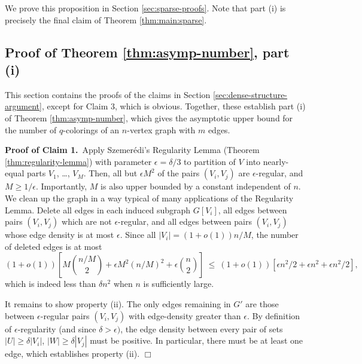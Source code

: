 \documentclass[11pt]{article}
\begin{document}
We prove this proposition in Section \ref{sec:sparse-proofs}.  Note
that part (i) is precisely the final claim of Theorem
\ref{thm:main:sparse}.




\subsection{Proof of Theorem \ref{thm:asymp-number}, part (i)}

This section contains the proofs of the claims in Section
\ref{sec:dense-structure-argument}, except for Claim 3, which is
obvious.  Together, these establish part (i) of Theorem
\ref{thm:asymp-number}, which gives the asymptotic upper bound for the
number of $q$-colorings of an $n$-vertex graph with $m$ edges.

\vspace{3mm}

\noindent \textbf{Proof of Claim 1.}\, Apply Szemer\'edi's Regularity
Lemma (Theorem \ref{thm:regularity-lemma}) with parameter $\epsilon =
\delta/3$ to partition of $V$ into nearly-equal parts $V_1$, \ldots,
$V_M$.  Then, all but $\epsilon M^2$ of the pairs $(V_i, V_j)$ are
$\epsilon$-regular, and $M \geq 1/\epsilon$.  Importantly, $M$ is also
upper bounded by a constant independent of $n$.  We clean up the graph
in a way typical of many applications of the Regularity Lemma.  Delete
all edges in each induced subgraph $G[V_i]$, all edges between pairs
$(V_i, V_j)$ which are not $\epsilon$-regular, and all edges between
pairs $(V_i, V_j)$ whose edge density is at most $\epsilon$. Since all
$|V_i| = (1+o(1))n/M$, the number of deleted edges is at most
\begin{displaymath}
(1+o(1)) \left[ 
M {n/M \choose 2} 
+ 
\epsilon M^2 (n/M)^2
+
\epsilon {n \choose 2}
\right]
\ \leq \
(1+o(1)) [
\epsilon n^2 / 2
+
\epsilon n^2
+ 
\epsilon n^2 / 2
],
\end{displaymath}
which is indeed less than $\delta n^2$ when $n$ is sufficiently large.

It remains to show property (ii).  The only edges remaining in $G'$
are those between $\epsilon$-regular pairs $(V_i, V_j)$ with
edge-density greater than $\epsilon$.  By definition of
$\epsilon$-regularity (and since $\delta > \epsilon)$, 
the edge density between
every pair of
sets $|U| \geq \delta |V_i|$, $|W| \geq \delta |V_j|$ must be
positive.  In particular, there must be at least one
edge, which establishes property (ii).  \hfill $\Box$
\end{document}
